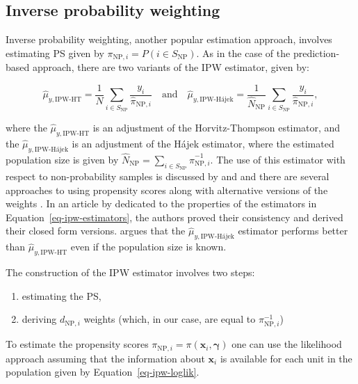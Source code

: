 \documentclass[nojss]{jss}
\begin{document}
\subsection{Inverse probability weighting}\label{sec-ipw}

Inverse probability weighting, another popular estimation approach,
involves estimating PS given by
\(\pi_{\text{NP},i}=P\left(i \in S_{\text{NP}} \right)\). As in the case
of the prediction-based approach, there are two variants of the IPW
estimator, given by:

\begin{equation}
  \hat{\mu}_{y,\text{IPW-HT}}=\frac{1}{N} \sum_{i \in S_{\text{NP}}} \frac{y_i}{\hat{\pi}_{\text{NP},i}} \quad \text{and} \quad 
  \hat{\mu}_{y,\text{IPW-H\'{a}jek}}=\frac{1}{\hat{N}_{\text{NP}}} \sum_{i \in S_{\text{NP}}} \frac{y_i}{\hat{\pi}_{\text{NP},i}},
\label{eq-ipw-estimators}
\end{equation}

where the \(\hat{\mu}_{y,\text{IPW-HT}}\) is an adjustment of the
Horvitz-Thompson estimator, and the
\(\hat{\mu}_{y,\text{IPW-H\'{a}jek}}\) is an adjustment of the Hájek
estimator, where the estimated population size is given by
\(\hat{N}_{\text{NP}} = \sum_{i \in S_{\text{NP}}} \hat{\pi}_{\text{NP},i}^{-1}\).
The use of this estimator with respect to non-probability samples is
discussed by \citet{lee2006propensity} and
\citet[Chapter 13]{biffignandi2021handbook} and there are several
approaches to using propensity scores along with alternative versions of
the weights \citep[cf.][Section 3]{elliott_inference_2017}. In an
article by \citet{chen2020doubly} dedicated to the properties of the
estimators in Equation~\ref{eq-ipw-estimators}, the authors proved their
consistency and derived their closed form versions.
\citet[Section 4.2]{wu2022statistical} argues that the
\(\hat{\mu}_{y,\text{IPW-H\'{a}jek}}\) estimator performs better than
\(\hat{\mu}_{y,\text{IPW-HT}}\) even if the population size is known.

The construction of the IPW estimator involves two steps:

\begin{enumerate}
\item estimating the PS, 
\item deriving $d_{\text{NP},i}$ weights (which, in our case, are equal to $\pi_{\text{NP},i}^{-1}$) 
\end{enumerate}

To estimate the propensity scores
\(\pi_{\text{NP},i}=\pi(\boldsymbol{x}_i, \boldsymbol{\gamma})\) one can
use the likelihood approach assuming that the information about
\(\boldsymbol{x}_i\) is available for each unit in the population given
by Equation~\ref{eq-ipw-loglik}.
\end{document}
